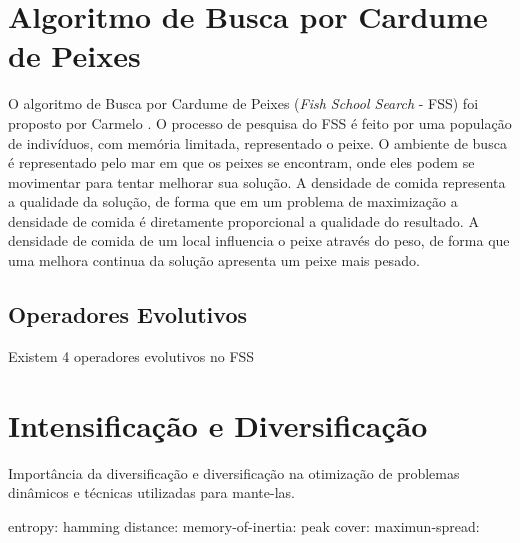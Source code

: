 \section{Algoritmo de Busca por Cardume de Peixes}
\label{sec:fish_school_search}
O algoritmo de Busca por Cardume de Peixes (\textit{Fish School Search} - FSS) foi proposto por Carmelo \cite{carmelo2008novel}. O processo de pesquisa do FSS é feito por uma população de indivíduos, com memória limitada, representado o peixe. O ambiente de busca é representado pelo mar em que os peixes se encontram, onde eles podem se movimentar para tentar melhorar sua solução. A densidade de comida representa a qualidade da solução, de forma que em um problema de maximização a densidade de comida é diretamente proporcional a qualidade do resultado. A densidade de comida de um local influencia o peixe através do peso, de forma que uma melhora continua da solução apresenta um peixe mais pesado.


\subsection{Operadores Evolutivos}
\label{sec:evolutionary_operators}
Existem 4 operadores evolutivos no FSS \cite{c2009influence}

\section{Intensificação e Diversificação}
\label{sec:intesification_diversification}
Importância da diversificação e diversificação na otimização de problemas dinâmicos e técnicas utilizadas para mante-las.

entropy: \cite{mori2001adaptation}
hamming distance: \cite{rand2005measurements}
memory-of-inertia: \cite{morrison2001measurement}
peak cover: \cite{branke2012evolutionary}
maximun-spread: \cite{goh2009competitive}